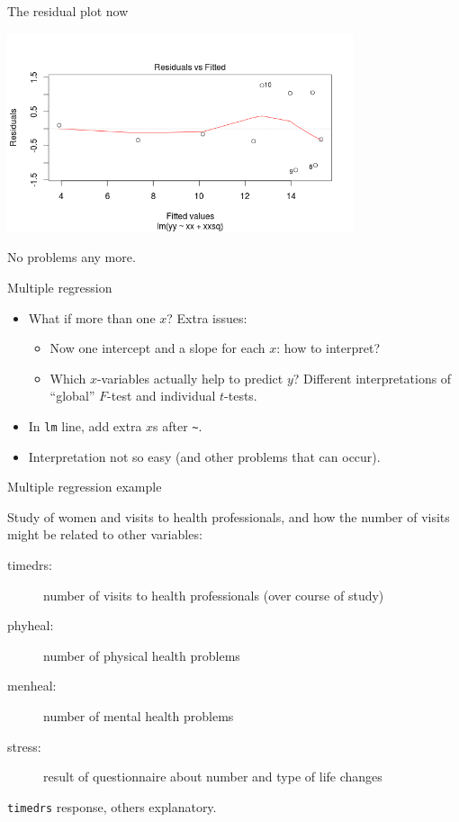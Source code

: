 \documentclass{beamer}
\begin{document}
\begin{frame}{The residual plot now}

\includegraphics[width=4in]{curvy-resid2}

No problems any more.  

\end{frame}


\begin{frame}[fragile]{Multiple regression}

  \begin{itemize}
  \item What if more than one $x$? Extra issues: %
    \begin{itemize}
    \item Now one intercept and a slope for each $x$: how to interpret?
    \item Which $x$-variables actually help to predict $y$?
 Different interpretations of ``global'' $F$-test and individual $t$-tests.
    \end{itemize}
  \item In \verb-lm- line, add extra $x$s after \verb-~-.
  \item Interpretation not so easy (and other problems that can occur).
  \end{itemize}

\end{frame}

\begin{frame}[fragile]{Multiple regression example}

Study of women and visits to health professionals, and how the number of visits might be related to other variables:

\begin{description}
\item[timedrs:] number of visits to health professionals (over course of study)
\item[phyheal:] number of physical health problems
\item[menheal:] number of mental health problems
\item[stress:] result of questionnaire about number and type of life changes
\end{description}

\verb-timedrs- response, others explanatory.

\end{frame}
\end{document}

